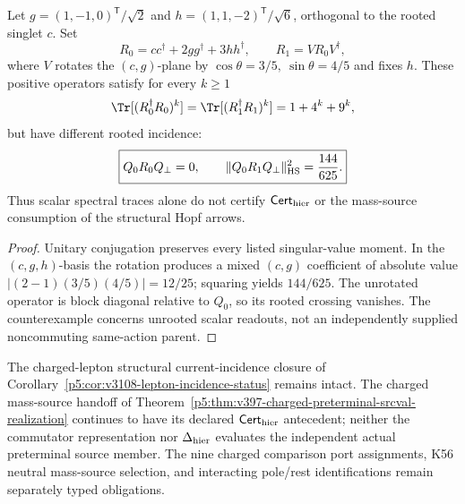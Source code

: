 \documentclass[12pt,a4paper]{article}
\begin{document}
\begin{proposition}
\label{p5:prop:v3211-spectral-moment-orientation-nogo}
Let \(g=(1,-1,0)^{\mathsf T}/\sqrt2\) and
\(h=(1,1,-2)^{\mathsf T}/\sqrt6\), orthogonal to the rooted singlet
\(c\).  Set
\[
 R_0=cc^\dagger+2gg^\dagger+3hh^\dagger,
 \qquad R_1=VR_0V^\dagger,
\]
where \(V\) rotates the \((c,g)\)-plane by
\(\cos\theta=3/5,\ \sin\theta=4/5\) and fixes \(h\).  These
positive operators satisfy for every \(k\ge1\)
\[
 \Tr[(R_0^\dagger R_0)^k]
 =\Tr[(R_1^\dagger R_1)^k]=1+4^k+9^k,
\]
but have different rooted incidence:
\[
 \boxed{Q_0R_0Q_\perp=0,\qquad
   \|Q_0R_1Q_\perp\|_{\rm HS}^2=\frac{144}{625}.}
\]
Thus scalar spectral traces alone do not certify \(\mathsf{Cert}_{\rm hier}\)
or the mass-source consumption of the structural Hopf arrows.
\end{proposition}
\begin{proof}
Unitary conjugation preserves every listed singular-value moment.  In the
\((c,g,h)\)-basis the rotation produces a mixed \((c,g)\) coefficient of
absolute value \(|(2-1)(3/5)(4/5)|=12/25\); squaring yields \(144/625\).
The unrotated operator is block diagonal relative to \(Q_0\), so its
rooted crossing vanishes.  The counterexample concerns unrooted scalar
readouts, not an independently supplied noncommuting same-action parent.
\end{proof}

\begin{remark}
\label{p5:rem:v3211-hurwitz-source-status}
The charged-lepton structural current-incidence closure of
Corollary~\ref{p5:cor:v3108-lepton-incidence-status} remains intact.
The charged mass-source handoff of
Theorem~\ref{p5:thm:v397-charged-preterminal-srcval-realization} continues
to have its declared \(\mathsf{Cert}_{\rm hier}\) antecedent; neither the
commutator representation nor \(\Delta_{\rm hier}\) evaluates the
independent actual preterminal source member.  The nine charged comparison
port assignments, K56 neutral mass-source selection, and interacting
pole/rest identifications remain separately typed obligations.
\end{remark}
\end{document}
